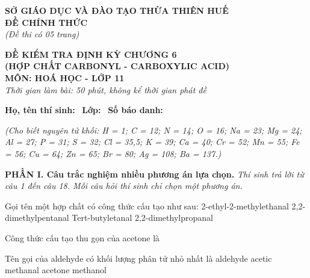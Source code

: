\documentclass[12pt,a4paper]{article}
\begin{document}
\thispagestyle{firstpage}

\noindent
\begin{minipage}[t]{0.44\textwidth}
	\centering\fontsize{10pt}{12pt}\selectfont
	\textbf{SỞ GIÁO DỤC VÀ ĐÀO TẠO THỪA THIÊN HUẾ}\\
	\textbf{ĐỀ CHÍNH THỨC}\\
	\textit{(Đề thi có 05 trang)}
\end{minipage}\hfill
\begin{minipage}[t]{0.54\textwidth}
	\centering\fontsize{10.5pt}{13pt}\selectfont
	\textbf{ĐỀ KIỂM TRA ĐỊNH KỲ CHƯƠNG 6}\\
	\textbf{(HỢP CHẤT CARBONYL - CARBOXYLIC ACID)}\\
	\textbf{MÔN: HOÁ HỌC - LỚP 11}\\
	\textit{Thời gian làm bài: 50 phút, không kể thời gian phát đề}
	
	\smallskip
\end{minipage}

\smallskip
\noindent\hrulefill
\smallskip

\noindent\textbf{Họ, tên thí sinh:} \dotfill\ \textbf{Lớp:} \dotfill\ \textbf{Số báo danh:} \dotfill

\smallskip
\noindent\textit{(Cho biết nguyên tử khối: H = 1; C = 12; N = 14; O = 16; Na = 23; Mg = 24; Al = 27; P = 31; S = 32; Cl = 35,5; K = 39; Ca = 40; Cr = 52; Mn = 55; Fe = 56; Cu = 64; Zn = 65; Br = 80; Ag = 108; Ba = 137.)}

\smallskip
\noindent\textbf{\large PHẦN I. Câu trắc nghiệm nhiều phương án lựa chọn.}
\textit{Thí sinh trả lời từ câu 1 đến câu 18. Mỗi câu hỏi thí sinh chỉ chọn một phương án.}
\vspace{0.2cm}

\begin{ex}
Gọi tên một hợp chất có công thức cấu tạo như sau: 
\choice
{2-ethyl-2-methylethanal}
{2,2-dimethylpentanal}
{Tert-butyletanal}
{2,2-dimethylpropanal}
\end{ex}

\begin{ex}
Công thức cấu tạo thu gọn của acetone là
\choice
{}
{}
{}
{}
\end{ex}

\begin{ex}
Tên gọi của aldehyde có khối lượng phân tử nhỏ nhất là
\choice
{aldehyde acetic}
{methanal}
{acetone}
{methanol}
\end{ex}
\end{document}
